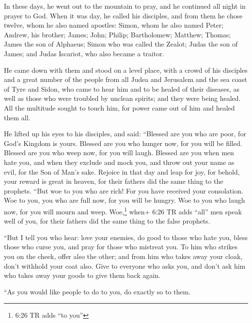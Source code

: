  In these days, he went out to the mountain to pray, and he
continued all night in prayer to God.  When it was day, he
called his disciples, and from them he chose twelve, whom he also named
apostles:  Simon, whom he also named Peter; Andrew, his
brother; James; John; Philip; Bartholomew;  Matthew;
Thomas; James the son of Alphaeus; Simon who was called the Zealot;
 Judas the son of James; and Judas Iscariot, who also
became a traitor.

 He came down with them and stood on a level place, with a
crowd of his disciples and a great number of the people from all Judea
and Jerusalem and the sea coast of Tyre and Sidon, who came to hear him
and to be healed of their diseases,  as well as those who
were troubled by unclean spirits; and they were being healed.
 All the multitude sought to touch him, for power came out
of him and healed them all.

 He lifted up his eyes to his disciples, and said:
``Blessed are you who are poor, for God's Kingdom is yours.
 Blessed are you who hunger now, for you will be filled.
Blessed are you who weep now, for you will laugh.  Blessed
are you when men hate you, and when they exclude and mock you, and throw
out your name as evil, for the Son of Man's sake.  Rejoice
in that day and leap for joy, for behold, your reward is great in
heaven, for their fathers did the same thing to the prophets.
 ``But woe to you who are rich! For you have received your
consolation.  Woe to you, you who are full now, for you
will be hungry. Woe to you who laugh now, for you will mourn and weep.
 Woe,\footnote{6:26 TR adds ``to you''} when+ 6:26 TR adds
``all'' men speak well of you, for their fathers did the same thing to
the false prophets.

 ``But I tell you who hear: love your enemies, do good to
those who hate you,  bless those who curse you, and pray
for those who mistreat you.  To him who strikes you on the
cheek, offer also the other; and from him who takes away your cloak,
don't withhold your coat also.  Give to everyone who asks
you, and don't ask him who takes away your goods to give them back
again.

 ``As you would like people to do to you, do exactly so to
them.


